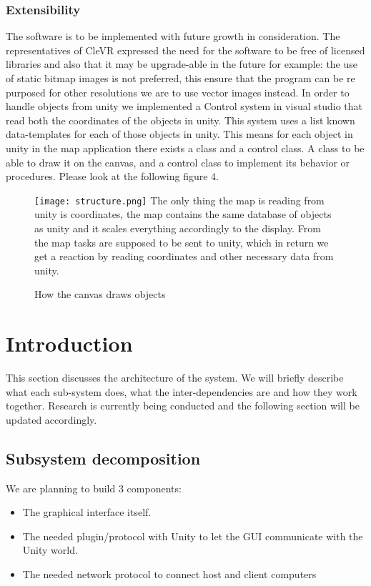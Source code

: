 \documentclass[11pt]{article}
\begin{document}
        \subsubsection{Extensibility}
        The software is to be implemented with future growth in consideration. The representatives of CleVR expressed the need for the software to be free of licensed libraries and also that it may be upgrade-able in the future for example: the use of static bitmap images is not preferred, this ensure that the program can be re purposed for other resolutions we are to use vector images instead. 
        In order to handle objects from unity we implemented a Control system in visual studio that read both the coordinates of the objects in unity. This system uses a list known data-templates for each of those objects in unity. 
        This means for each object in unity in the map application there exists a class and a control class. A class to be able to draw it on the canvas, and a control class to implement its behavior or procedures. Please look at the following figure 4.
        \begin{figure}[H]
	\caption{How the canvas draws objects}
	\texttt{[image: structure.png]}
    The only thing the map is reading from unity is coordinates, the map contains the same database of objects as unity and it scales everything accordingly to the display. From the map tasks are supposed to be sent to unity, which in return we get a reaction by reading coordinates and other necessary data from unity.
\end{figure}
        


\section{Introduction}
This section discusses the architecture of the system. We will briefly describe what each sub-system does, what the inter-dependencies are and how they work together. Research is currently being conducted and the following section will be updated accordingly.

    \subsection{Subsystem decomposition}
    We are planning to build 3 components:
	\begin{itemize}
  		\item The graphical interface itself.
  		\item The needed plugin/protocol with Unity to let the GUI communicate with the Unity world.
        \item The needed network protocol to connect host and client computers
	\end{itemize}   
    
\end{document}
